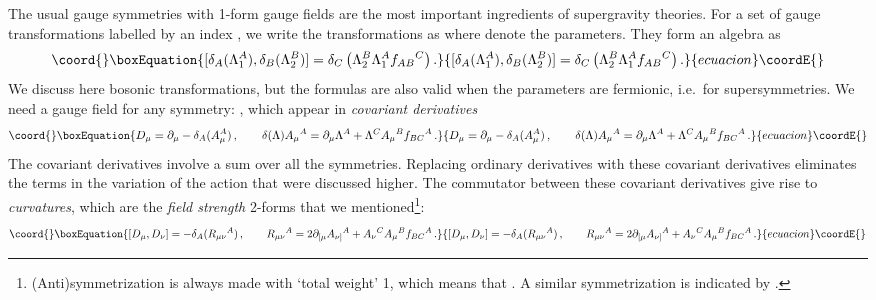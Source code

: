 \documentclass[a4paper,11pt,twoside]{article}
\providecommand{\Red}[1]{#1}
\providecommand{\OliveGreen}[1]{#1}
\providecommand{\RawSienna}[1]{#1}
\providecommand{\Blue}[1]{#1}
\providecommand{\ft}[2]{{\textstyle\frac{#1}{#2}}}
\begin{document}
The usual gauge symmetries with 1-form gauge fields are the most
important ingredients of supergravity theories. For a set of gauge
transformations labelled by an index \coordHE{}, we write the transformations as
\coordHE{} where \coordHE{} denote the parameters. They
form an algebra as
\begin{equation}\coord{}\boxEquation{
  [\delta_A( \OliveGreen{\Lambda_1^A}),\delta_B(\OliveGreen{\Lambda_2^B})] =\delta_C\left(
\OliveGreen{\Lambda_2^B\Lambda_1^A} \Red{f_{AB}{}^C}\right).
 \label{commutator}
}{
  [\delta_A( \OliveGreen{\Lambda_1^A}),\delta_B(\OliveGreen{\Lambda_2^B})] =\delta_C\left(
\OliveGreen{\Lambda_2^B\Lambda_1^A} \Red{f_{AB}{}^C}\right).
 }{ecuacion}\coordE{}\end{equation}
We discuss here bosonic transformations, but the formulas are also valid
when the parameters are fermionic, i.e.\ for supersymmetries. We need a
gauge field for any symmetry: \myHighlight{$\Blue{A_\mu{}^A}$}\coordHE{}, which appear in
\emph{covariant derivatives}
\begin{equation}\coord{}\boxEquation{
 \RawSienna{D_\mu} =\partial _\mu -\delta_A(\Blue{A_\mu ^A})\,, \qquad
  \delta(\OliveGreen{\Lambda}) \Blue{A_\mu{}^A}=
\partial_\mu\OliveGreen{\Lambda^A} +\OliveGreen{\Lambda^C} \Blue{A_\mu{}^B} \Red{f_{BC}{}^A}\,.
 \label{covder}
}{
 \RawSienna{D_\mu} =\partial _\mu -\delta_A(\Blue{A_\mu ^A})\,, \qquad
  \delta(\OliveGreen{\Lambda}) \Blue{A_\mu{}^A}=
\partial_\mu\OliveGreen{\Lambda^A} +\OliveGreen{\Lambda^C} \Blue{A_\mu{}^B} \Red{f_{BC}{}^A}\,.
 }{ecuacion}\coordE{}\end{equation}
The covariant derivatives involve a sum over all the symmetries.
Replacing ordinary derivatives with these covariant derivatives
eliminates the \myHighlight{$\partial \Lambda $}\coordHE{} terms in the variation of the action
that were discussed higher. The commutator between these covariant
derivatives give rise to \emph{curvatures}, which are the \emph{field
strength} 2-forms that we mentioned\footnote{(Anti)symmetrization is
always made with `total weight' 1, which means that
\myHighlight{$\partial_{[\mu}A_{\nu]}=\ft12\left(
\partial _\mu A_\nu -\partial _\nu A_\mu \right) $}\coordHE{}. A similar
symmetrization is indicated by \myHighlight{$(\mu \nu )$}\coordHE{}.}:
\begin{equation}\coord{}\boxEquation{
  [\RawSienna{D_\mu},\RawSienna{D_\nu}]=-\delta _A(\RawSienna{R_{\mu \nu
  }{}^A})\,,\qquad
\RawSienna{R_{\mu\nu}{}^A} =
 2\partial_{[\mu}\Blue{A_{\nu]}}{}^A+ \Blue{A_\nu{}^C A_\mu{}^B}
 \Red{f_{BC}{}^A}\,.
 \label{curvatures}
}{
  [\RawSienna{D_\mu},\RawSienna{D_\nu}]=-\delta _A(\RawSienna{R_{\mu \nu
  }{}^A})\,,\qquad
\RawSienna{R_{\mu\nu}{}^A} =
 2\partial_{[\mu}\Blue{A_{\nu]}}{}^A+ \Blue{A_\nu{}^C A_\mu{}^B}
 \Red{f_{BC}{}^A}\,.
 }{ecuacion}\coordE{}\end{equation}
\end{document}
